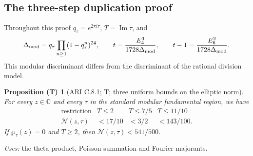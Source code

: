 \documentclass[11pt,a4paper]{article}
\theoremstyle{plain}
\newtheorem{proposition}[theorem]{Proposition (T)}
\theoremstyle{definition}
\newcommand{\C}{\mathbb C}
\begin{document}
\subsection{The three-step duplication proof}
Throughout this proof $q_\tau=e^{2\pi i\tau}$, $T=\operatorname{Im}\tau$, and
\[
\Delta_{\rm mod}=q_\tau\prod_{n\ge1}(1-q_\tau^n)^{24},\qquad
 t=\frac{E_4^3}{1728\Delta_{\rm mod}},\qquad
 t-1=\frac{E_6^2}{1728\Delta_{\rm mod}}.
\]
This modular discriminant differs from the discriminant of the rational division model.

\begin{proposition}[ARI C.8.1; T; three uniform bounds on the elliptic norm]\label{ari:C.8.1}
For every $z\in\C$ and every $\tau$ in the standard modular
fundamental region, we have
\[
 \begin{array}{c|ccc}
 \text{restriction}&T\le2&T\le7/5&T\le11/10\\ \hline
 \mathcal N(z,\tau)&<17/10&<3/2&<143/100.
 \end{array}
\]
If $\wp_\tau(z)=0$ and $T\ge2$, then $\mathcal N(z,\tau)<541/500$.
\end{proposition}
\noindent\textit{Uses:} the theta product, Poisson summation and Fourier majorants.\par
\end{document}
